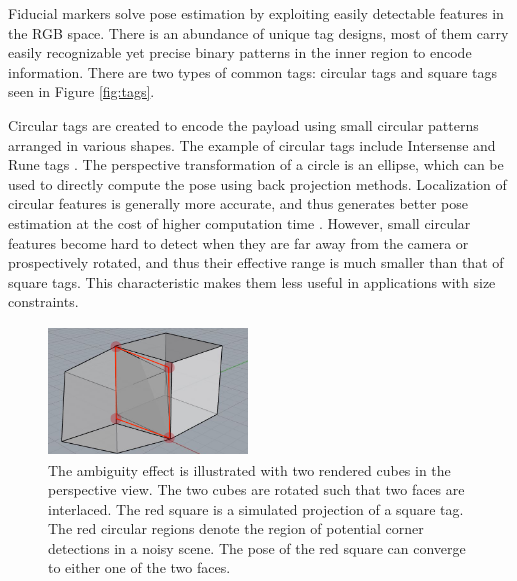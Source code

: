 	Fiducial markers solve pose estimation by exploiting easily detectable features in the RGB space. There is an abundance of unique tag designs, most of them carry easily recognizable yet precise binary patterns in the inner region to encode information. There are two types of common tags: circular tags and square tags seen in Figure \ref{fig:tags}. 
	
	Circular tags are created to encode the payload using small circular patterns arranged in various shapes. The example of circular tags include Intersense \citep{naimark2002circular} and Rune tags \citep{bergamasco2011rune}. The perspective transformation of a circle is an ellipse, which can be used to directly compute the pose using back projection methods. Localization of circular features is generally more accurate, and thus generates better pose estimation at the cost of higher computation time \citep{rice2006analysing}. However, small circular features become hard to detect when they are far away from the camera or prospectively rotated, and thus their effective range is much smaller than that of square tags. This characteristic makes them less useful in applications with size constraints. 
	
\begin{figure}
\centering
\includegraphics[width=200px, height=130px]{figs/perspective_fig}
\caption{The ambiguity effect is illustrated with two rendered cubes in the perspective view. The two cubes are rotated such that two faces are interlaced. The red square is a simulated projection of a square tag. The red circular regions denote the region of potential corner detections in a noisy scene. The pose of the red square can converge to either one of the two faces.}
\label{fig:cube}
\end{figure}
	
